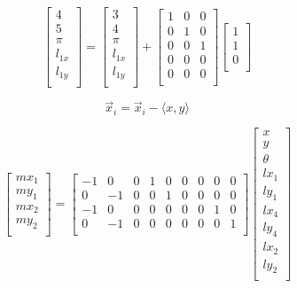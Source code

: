 \documentclass[prodmode,acmtecs]{acmsmall} %
\begin{document}
$$
\begin{bmatrix}
    4 \\
    5 \\
    \pi \\
    l_{1x} \\
    l_{1y} \\
\end{bmatrix}
=
\begin{bmatrix}
    3 \\
    4 \\
    \pi  \\
    l_{1x} \\
    l_{1y} \\
\end{bmatrix}
+
\begin{bmatrix}
    1 & 0 & 0  \\
    0 & 1 & 0  \\
    0 & 0 & 1  \\
    0 & 0 & 0  \\
    0 & 0 & 0  \\
\end{bmatrix}
\begin{bmatrix}
    1 \\
    1 \\
    0 \\
\end{bmatrix}
$$

$$
\vec{x}_i = \vec{x}_i - \langle x, y \rangle
$$

$$
\begin{bmatrix}
    mx_1 \\
    my_1 \\
    mx_2 \\
    my_2 \\
\end{bmatrix}
=
\begin{bmatrix}
    -1 & 0 & 0 & 1 & 0 & 0 & 0 & 0 & 0 \\
    0 & -1 & 0 & 0 & 1 & 0 & 0 & 0 & 0 \\
    -1 & 0 & 0 & 0 & 0 & 0 & 0 & 1 & 0 \\
    0 & -1 & 0 & 0 & 0 & 0 & 0 & 0 & 1 \\
\end{bmatrix}
\begin{bmatrix}
    x \\
    y \\
    \theta \\
    lx_1 \\
    ly_1 \\
    lx_4 \\
    ly_4 \\
    lx_2 \\
    ly_2 \\
\end{bmatrix}
$$
\end{document}
